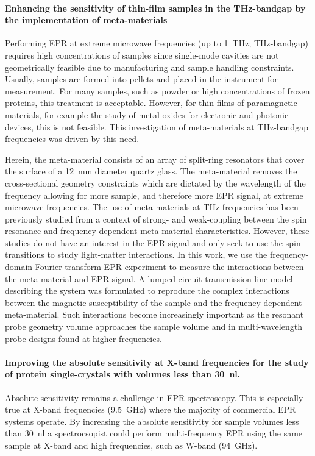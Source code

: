 \hspace{1em}
\paragraph*{Enhancing the sensitivity of thin-film samples in the THz-bandgap by the implementation of meta-materials}
Performing EPR at extreme microwave frequencies (up to 1~THz; THz-bandgap) requires high concentrations of samples since single-mode cavities are not geometrically feasible due to manufacturing and sample handling constraints. Usually, samples are formed into pellets and placed in the instrument for measurement. \cite{NEHRKORN201710} For many samples, such as powder or high concentrations of frozen proteins, this treatment is acceptable. However, for thin-films of paramagnetic materials, for example the study of metal-oxides for electronic and photonic devices, this is not feasible. \cite{oxidesurface} This investigation of meta-materials at THz-bandgap frequencies was driven by this need.

Herein, the meta-material consists of an array of split-ring resonators that cover the surface of a 12~mm diameter quartz glass. The meta-material removes the cross-sectional geometry constraints which are dictated by the wavelength of the frequency allowing for more sample, and therefore more EPR signal, at extreme microwave frequencies. The use of meta-materials at THz frequencies has been previously studied from a context of strong- and weak-coupling between the spin resonance and frequency-dependent meta-material characteristics.\cite{SchneiderEPR,BOERO2013133,Scalari1323} However, these studies do not have an interest in the EPR signal and only seek to use the spin transitions to study light-matter interactions. In this work, we use the frequency-domain Fourier-transform EPR experiment to measure the interactions between the meta-material and EPR signal. A lumped-circuit transmission-line model describing the system was formulated to reproduce the complex interactions between the magnetic susceptibility of the sample and the frequency-dependent meta-material. Such interactions become increasingly important as the resonant probe geometry volume approaches the sample volume and in multi-wavelength probe designs found at higher frequencies. \cite{grinbergVHF}

\hspace{1em}
\paragraph{Improving the absolute sensitivity at X-band frequencies for the study of protein single-crystals with volumes less than 30~nl.}
Absolute sensitivity remains a challenge in EPR spectroscopy. This is especially true at X-band frequencies (9.5~GHz) where the majority of commercial EPR systems operate. By increasing the absolute sensitivity for sample volumes less than 30~nl a spectrocsopist could perform multi-frequency EPR using the same sample at X-band and high frequencies, such as W-band (94~GHz). 

